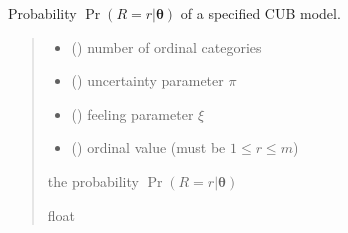 \documentclass[letterpaper,10pt,english]{sphinxmanual}
\begin{document}
\begin{fulllineitems}
\label{\detokenize{cubmods:cubmods.cub.prob}}
\pysigstartsignatures
{}
\pysigstopsignatures
\sphinxAtStartPar
Probability \(\Pr(R = r | \pmb\theta)\) of a specified CUB model.
\begin{quote}\begin{description}
\begin{itemize}
\item {} 
\sphinxAtStartPar
{} () \textendash{} number of ordinal categories

\item {} 
\sphinxAtStartPar
{} () \textendash{} uncertainty parameter \(\pi\)

\item {} 
\sphinxAtStartPar
{} () \textendash{} feeling parameter \(\xi\)

\item {} 
\sphinxAtStartPar
{} () \textendash{} ordinal value (must be \(1 \leq r \leq m\))

\end{itemize}

\sphinxAtStartPar
the probability \(\Pr(R = r | \pmb\theta)\)

\sphinxAtStartPar
float

\end{description}\end{quote}

\end{fulllineitems}

\end{document}
